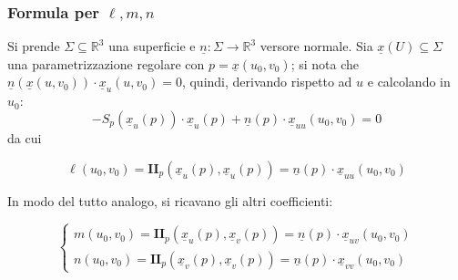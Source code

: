 \documentclass[12pt]{scrartcl}
\theoremstyle{style}
\newenvironment{boxenv}[1][]{
    \begin{eqbox}[#1]
    }{
   \end{eqbox}
}
\numberwithin{equation}{subsection}
\begin{document}
\subsubsection{Formula per $\ell ,m,n$}
Si prende $\Sigma \subseteq \mathbb{R}^3$ una superficie e $\underline{n}: \Sigma \to \mathbb{R}^3$ versore normale.
Sia $\underline{x}(U) \subseteq \Sigma$ una parametrizzazione regolare con $p = \underline{x}(u_0,v_0)$; si nota che $\underline{n}(\underline{x}(u,v_0)) \cdot \underline{x}_u(u,v_0) = 0 $, quindi, derivando rispetto ad $u$ e calcolando in $u_0$:
\[
-S_p (\underline{x}_u (p)) \cdot \underline{x}_u (p) + \underline{n}(p) \cdot \underline{x}_{uu} (u_0,v_0) = 0 
\] 
da cui
\begin{boxenv}[]
\begin{equation}
	\ell (u_0,v_0) = \mathbf{I I} _p (\underline{x}_u(p), \underline{x}_u(p)) = \underline{n}(p) \cdot \underline{x}_{u u } (u_0,v_0)
\end{equation}
\end{boxenv}
In modo del tutto analogo, si ricavano gli altri coefficienti:
\begin{boxenv}[]
\begin{equation}
	\begin{cases}
		m(u_0,v_0) = \mathbf{II} _p (\underline{x}_u(p),\underline{x}_v(p)) = \underline{n}(p) \cdot \underline{x}_{uv} (u_0,v_0)\\
		n (u_0,v_0) = \mathbf{I I} _p (\underline{x}_v(p),\underline{x}_v(p)) = \underline{n}(p) \cdot \underline{x}_{v v } (u_0,v_0)
	\end{cases}
\end{equation}
\end{boxenv}
\end{document}
